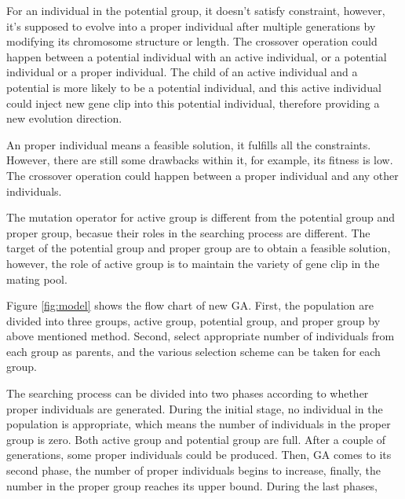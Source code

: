 For an individual in the potential group, it doesn't satisfy constraint,
however, it's supposed to evolve into a proper individual after multiple
generations by modifying its chromosome structure or length. The crossover
operation could happen between a potential individual with an active
individual, or a potential individual or a proper individual. The child of an
active individual and a potential is more likely to be a potential individual,
and this active individual could inject new gene clip into this potential
individual, therefore providing a new evolution direction. 


An proper individual means a feasible solution, it fulfills all the constraints. 
However, there are still some drawbacks within it, for example, its fitness is low.
The crossover operation  could happen between a proper individual and any other individuals.


The mutation operator for active group is different from the potential group
and proper group, becasue their roles in the searching process are different.
The target of the potential group and proper group are to obtain a feasible
solution, however, the role of active group is to maintain the variety of gene
clip in the mating pool. 

Figure \ref{fig:model} shows the flow chart of new GA. First, the
population are divided into three groups, active group, potential group, and
proper group by above mentioned method. Second, select appropriate number of
individuals from each group as parents, and the various selection scheme can be
taken for each group. 


The searching process can be divided into two phases according to whether
proper individuals are generated.  During the initial stage, no individual in
the population is appropriate, which means the number of individuals in the
proper group is zero. Both active group and potential group are full. After a
couple of generations, some proper individuals could be produced. Then, GA
comes to its second phase, the number of proper individuals begins to increase,
finally, the number in the proper group reaches its upper bound. During the
last phases, 


